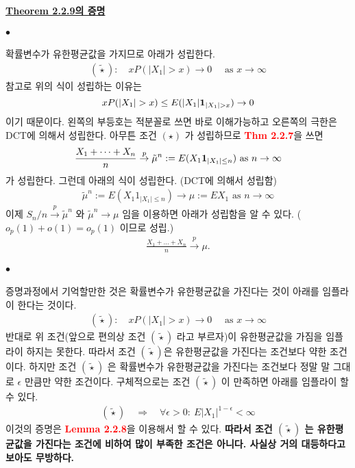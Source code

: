 \documentclass[12pt,oneside,english,a4paper]{article}
\def\ck{\paragraph{\Large$\bullet$}\Large}
\begin{document}
\paragraph{\underline{\LARGE Theorem 2.2.9의 증명}}


\ck 확률변수가 유한평균값을 가지므로 아래가 성립한다. 
\begin{align*}
(\tilde\star):\quad xP(|X_1|> x ) \to 0 \quad \mbox{ as } x \to \infty 
\end{align*}
참고로 위의 식이 성립하는 이유는 
\[
xP(|X_1|> x ) \leq E( |X_1|{\bf 1}_ {|X_1|>x} ) \to 0
\]
이기 때문이다. 왼쪽의 부등호는 적분꼴로 쓰면 바로 이해가능하고 오른쪽의 극한은 DCT에 의해서 성립한다. 아무튼 조건 $(\star)$ 가 성립하므로 \textbf{\textcolor{red}{Thm 2.2.7}}을 쓰면 
\begin{align*}
\frac{X_1+\dots+X_n}{n} \overset{p}{\to} \tilde{\mu}^{n}:=E(X_1 {\bf 1}_ {|X_1|\leq n}) \mbox{ as } n \to \infty 
\end{align*} 
가 성립한다. 그런데 아래의 식이 성립한다. (DCT에 의해서 성립함) 
\begin{align*}
\tilde\mu^{n}:=E(X_1 1_ {|X_1|\leq n}) \to \mu:=EX_1 \mbox{ as } n \to \infty 
\end{align*}
이제 $S_n / n \overset{p}{\to} \tilde{\mu}^{n}$ 와 $\tilde{\mu}^{n}\to \mu$ 임을 이용하면 아래가 성립함을 알 수 있다. ($o_p(1)+o(1)=o_p(1)$ 이므로 성립.)
\begin{align*}
\frac{X_1+\dots+X_n}{n} \overset{p}{\to} \mu. 
\end{align*}

\ck 증명과정에서 기억할만한 것은 확률변수가 유한평균값을 가진다는 것이 아래를 임플라이 한다는 것이다. 
\begin{align*}
(\tilde\star):\quad xP(|X_1|> x ) \to 0 \quad \mbox{ as } x \to \infty 
\end{align*}
반대로 위 조건(앞으로 편의상 조건 $(\tilde\star)$ 라고 부르자)이 유한평균값을 가짐을 임플라이 하지는 못한다. 따라서 조건 $(\tilde\star)$은 유한평균값을 가진다는 조건보다 약한 조건이다. 하지만 조건 $(\tilde\star)$ 은 확률변수가 유한평균값을 가진다는 조건보다 정말 말 그대로 $\epsilon$ 만큼만 약한 조건이다. 구체적으로는 조건 $(\tilde\star)$ 이 만족하면 아래를 임플라이 할 수 있다. 
\begin{align*}
(\tilde\star) \quad \Longrightarrow \quad \forall \epsilon>0: ~ E|X_1 |^{1-\epsilon} < \infty
\end{align*}
이것의 증명은 \textbf{\textcolor{red}{Lemma 2.2.8}}을 이용해서 할 수 있다. \textbf{따라서 조건 $(\tilde\star)$ 는 유한평균값을 가진다는 조건에 비하여 많이 부족한 조건은 아니다. 사실상 거의 대등하다고 보아도 무방하다.}
\end{document}
